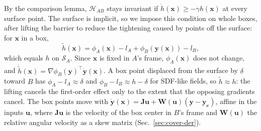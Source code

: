 \documentclass[journal]{IEEEtran}
\theoremstyle{definition}
\begin{document}
By the comparison lemma, $\mathcal H_{AB}$ stays invariant if $\dot h(\mathbf x)\ge-\gamma h(\mathbf x)$
at every surface point. The surface is implicit, so we impose this condition on whole boxes, after
lifting the barrier to reduce the tightening caused by points off the surface: for $\mathbf x$ in a
box,
\begin{equation}\label{eq:lift}
\tilde h(\mathbf x)=\phi_A(\mathbf x)-l_A+\phi_B(\mathbf y(\mathbf x))-l_B ,
\end{equation}
which equals $h$ on $\mathcal S_A$. Since $\mathbf x$ is fixed in $A$'s frame, $\phi_A(\mathbf x)$ does
not change, and $\dot{\tilde h}(\mathbf x)=\nabla\phi_B(\mathbf y)^\top\dot{\mathbf y}(\mathbf x)$. A
box point displaced from the surface by $\delta$ toward $B$ has $\phi_A-l_A\approx\delta$ and
$\phi_B-l_B\approx h-\delta$ for SDF-like fields, so $\tilde h\approx h$: the lifting cancels the
first-order effect only to the extent that the opposing gradients cancel. The box points move with
$\dot{\mathbf y}(\mathbf x)=\mathbf J\mathbf u+\mathbf W(\mathbf u)(\mathbf y-\mathbf y_{\mathbf c})$,
affine in the inputs $\mathbf u$, where $\mathbf J\mathbf u$ is the velocity of the box center in
$B$'s frame and $\mathbf W(\mathbf u)$ the relative angular velocity as a skew matrix
(Sec.~\ref{sec:cover-der}).
\end{document}
